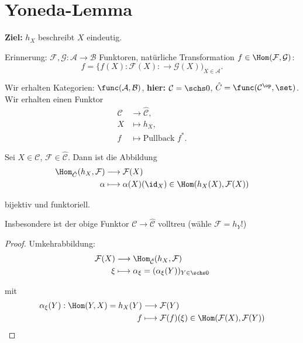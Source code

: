 \section{Yoneda-Lemma}

\textbf{Ziel:} $h_{X}$ beschreibt $X$ eindeutig.

Erinnerung: $\mathcal{F},\mathcal{G}:\mathcal{A}\rightarrow\mathcal{B}$
Funktoren, natürliche Transformation $f\in\Hom(\mathcal{F},\mathcal{G})$:
\[
  f=\{f(X):\mathcal{F}(X):\rightarrow\mathcal{G}(X))_{X\in\mathcal{A}}.
\]

Wir erhalten Kategorien: $\func(\mathcal{A},\mathcal{B})$, \textbf{hier:
}$\mathcal{C}=\schs0$, $\hat{C}=\func(\mathcal{C}^{\op},\set)$.
Wir erhalten einen Funktor
\begin{align*}
  \mathcal{C} & \longrightarrow\hat{\mathcal{C}},\\
  X & \longmapsto h_{X},\\
  f & \longmapsto\text{Pullback }f^{\ast}.
\end{align*}

\begin{prop}[5]
  Sei $X\in\mathcal{C}$, $\mathcal{F}\in\hat{\mathcal{C}}$. Dann
  ist die Abbildung
  \begin{align*}
    \Hom_{\hat{C}}(h_{X},\mathcal{F}) & \longrightarrow\mathcal{F}(X)\\
    \alpha & \longmapsto\alpha(X)(\id_{X})\in\Hom(h_{X}(X),\mathcal{F}(X))
  \end{align*}

  bijektiv und funktoriell.
\end{prop}

Insbesondere ist der obige Funktor $\mathcal{C}\rightarrow\hat{\mathcal{C}}$
volltreu (wähle $\mathcal{F}=h_{Y}$!)
\begin{proof}
  Umkehrabbildung:
  \begin{align*}
    \mathcal{F}(X) & \longrightarrow\Hom_{\hat{\mathcal{C}}}(h_{X},\mathcal{F})\\
    \xi & \longmapsto\alpha_{\xi}=(\alpha_{\xi}(Y))_{Y\in\schs0}
  \end{align*}

  mit
  \begin{align*}
    \alpha_{\xi}(Y):\Hom(Y,X)=h_{X}(Y) & \longrightarrow\mathcal{F}(Y)\\
    f & \longmapsto\mathcal{F}(f)(\xi)\in\Hom(\mathcal{F}(X),\mathcal{F}(Y))
  \end{align*}
\end{proof}

